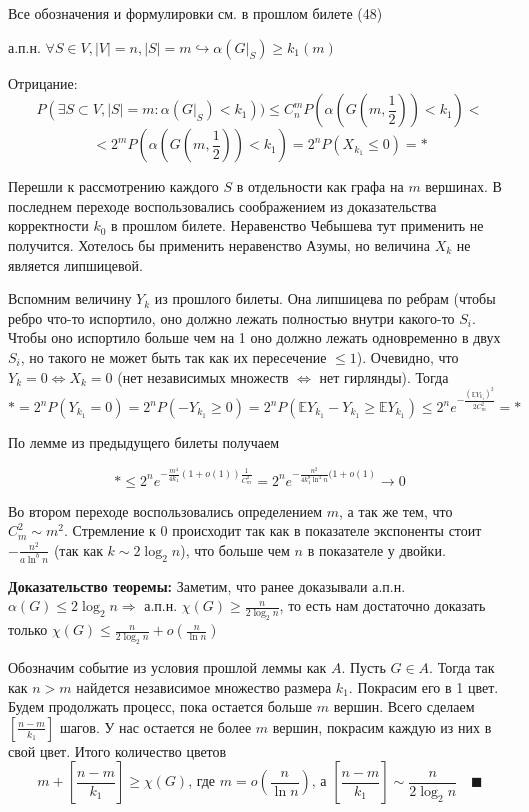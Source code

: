 \par \Note Все обозначения и формулировки см. в прошлом билете (48)

\par \Lemma а.п.н. $\forall S \in V, |V|=n, |S|=m \hookrightarrow \alpha(G|_S) \geq k_1(m)$
\par \Proof Отрицание:
$$P(\exists S \subset V, |S|=m: \alpha(G|_S) < k_1)) \leq C_n^m P(\alpha(G(m, \frac{1}{2})) < k_1)<$$ $$<2^m P(\alpha(G(m, \frac{1}{2})) < k_1)=2^n P(X_{k_1}\leq 0)=*$$
\par Перешли к рассмотрению каждого $S$ в отдельности как графа на $m$ вершинах. В последнем переходе воспользовались соображением из доказательства корректности $k_0$ в прошлом билете. Неравенство Чебышева тут применить не получится. Хотелось бы применить неравенство Азумы, но величина $X_k$ не является липшицевой. 

\par Вспомним величину $Y_k$ из прошлого билеты. Она липшицева по ребрам (чтобы ребро что-то испортило, оно должно лежать полностью внутри какого-то $S_i$. Чтобы оно испортило больше чем на 1 оно должно лежать одновременно в двух $S_i$, но такого не может быть так как их пересечение $\leq 1$). Очевидно, что $Y_k=0 \Leftrightarrow X_k=0$ (нет независимых множеств $\Leftrightarrow$ нет гирлянды). Тогда 
$$*=2^n P(Y_{k_1}=0)=2^nP(-Y_{k_1} \geq 0)=2^nP(\mathbb{E}Y_{k_1}-Y_{k_1} \geq \mathbb{E}Y_{k_1}) \leq 2^n e^{-\frac{(\mathbb{E}Y_{k_1})^2}{2C_m^2}}=*$$

\par По лемме из предыдущего билеты получаем

$$*\leq 2^n e^{-\frac{m^4}{4k_1}(1+o(1))\frac{1}{C_m^2}} = 2^n e^{-\frac{n^2}{4k_1^8 \ln^4 n}(1+o(1)}\rightarrow 0$$

\par Во втором переходе воспользовались определением $m$, а так же тем, что $C_m^2 \sim m^2$. Стремление к 0 происходит так как в показателе экспоненты стоит $-\frac{n^2}{a\ln^b n}$ (так как $k \sim 2 \log_2 n$), что больше чем $n$ в показателе у двойки. \EndProof

\par \textbf{Доказательство теоремы:} \Proof Заметим, что ранее доказывали а.п.н. $\alpha(G) \leq 2\log_2 n \Rightarrow$ а.п.н. $\chi(G) \geq \frac{n}{2\log_2 n}$, то есть нам достаточно доказать только $\chi(G) \leq \frac{n}{2\log_2 n}+o(\frac{n}{\ln{n}})$
\par Обозначим событие из условия прошлой леммы как $A$. Пусть $G \in A$. Тогда так как $n > m$ найдется независимое множество размера $k_1$. Покрасим его в 1 цвет. Будем продолжать процесс, пока остается больше $m$ вершин. Всего сделаем $[\frac{n-m}{k_1}]$ шагов. У нас остается не более $m$ вершин, покрасим каждую из них в свой цвет. Итого количество цветов $$m+[\frac{n-m}{k_1}] \geq \chi(G) \text{, где } m=o(\frac{n}{\ln{n}}) \text{, а } [\frac{n-m}{k_1}] \sim \frac{n}{2\log_2 n} \quad \blacksquare$$